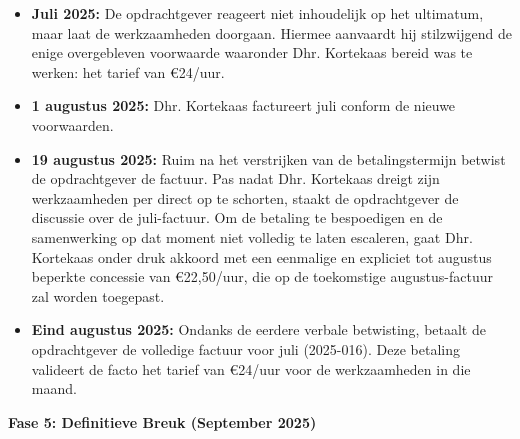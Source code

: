 \documentclass[10pt,a4paper]{article}
\begin{document}
\begin{adjustwidth}{15mm}{15mm}
\begin{itemize}
\item \textbf{Juli 2025:} De opdrachtgever reageert niet inhoudelijk op het ultimatum, maar laat de werkzaamheden doorgaan. Hiermee aanvaardt hij stilzwijgend de enige overgebleven voorwaarde waaronder Dhr. Kortekaas bereid was te werken: het tarief van €24/uur.
\item \textbf{1 augustus 2025:} Dhr. Kortekaas factureert juli conform de nieuwe voorwaarden.
\item \textbf{19 augustus 2025:} Ruim na het verstrijken van de betalingstermijn betwist de opdrachtgever de factuur. Pas nadat Dhr. Kortekaas dreigt zijn werkzaamheden per direct op te schorten, staakt de opdrachtgever de discussie over de juli-factuur. Om de betaling te bespoedigen en de samenwerking op dat moment niet volledig te laten escaleren, gaat Dhr. Kortekaas onder druk akkoord met een eenmalige en expliciet tot augustus beperkte concessie van €22,50/uur, die op de toekomstige augustus-factuur zal worden toegepast.
\item \textbf{Eind augustus 2025:} Ondanks de eerdere verbale betwisting, betaalt de opdrachtgever de volledige factuur voor juli (2025-016). Deze betaling valideert de facto het tarief van €24/uur voor de werkzaamheden in die maand.
\end{itemize}

{\fontsize{10}{15}\selectfont\textbf{Fase 5: Definitieve Breuk (September 2025)}}


\end{adjustwidth}
\end{document}
